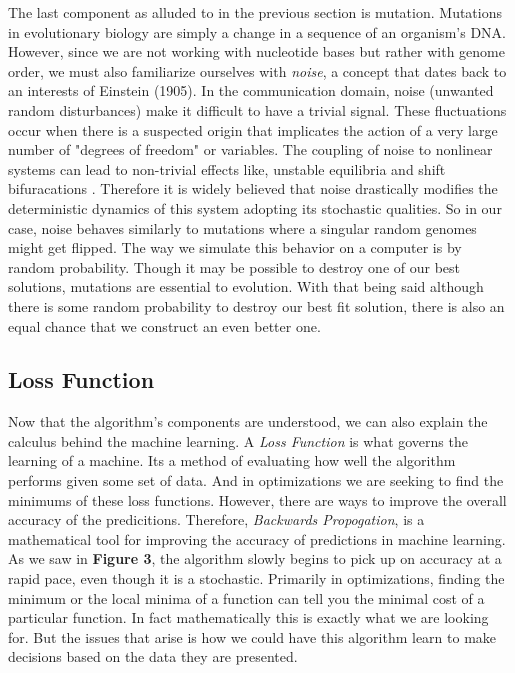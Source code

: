 The last component as alluded to in the previous section is mutation. 
Mutations in evolutionary biology are simply a change in a sequence of an organism's DNA. 
However, since we are not working with nucleotide bases but rather with genome order, we must also familiarize ourselves with \emph{noise}, a concept that dates back to an interests of Einstein (1905). 
In the communication domain, noise (unwanted random disturbances) make it difficult to have a trivial signal. 
These fluctuations occur when there is a suspected origin that implicates the action of a very large number of "degrees of freedom" or variables. 
The coupling of noise to nonlinear systems can lead to non-trivial effects like, unstable equilibria and shift bifuracations \cite{Gammaitoni}. 
Therefore it is widely believed that noise drastically modifies the deterministic dynamics of this system adopting its stochastic qualities. 
So in our case, noise behaves similarly to mutations where a singular random genomes might get flipped. 
The way we simulate this behavior on a computer is by random probability. 
Though it may be possible to destroy one of our best solutions, mutations are essential to evolution. 
With that being said although there is some random probability to destroy our best fit solution, there is also an equal chance that we construct an even better one. 

\subsection{Loss Function}

Now that the algorithm's components are understood, we can also explain the calculus behind the machine learning. 
A \emph{Loss Function} is what governs the learning of a machine. 
Its a method of evaluating how well the algorithm performs given some set of data.
And in optimizations we are seeking to find the minimums of these loss functions.
However, there are ways to improve the overall accuracy of the predicitions.
Therefore, \emph{Backwards Propogation}, is a mathematical tool for improving the accuracy of predictions in machine learning. 
As we saw in \textbf{Figure 3}, the algorithm slowly begins to pick up on accuracy at a rapid pace, even though it is a stochastic. 
Primarily in optimizations, finding the minimum or the local minima of a function can tell you the minimal cost of a particular function. 
In fact mathematically this is exactly what we are looking for. 
But the issues that arise is how we could have this algorithm learn to make decisions based on the data they are presented. 

